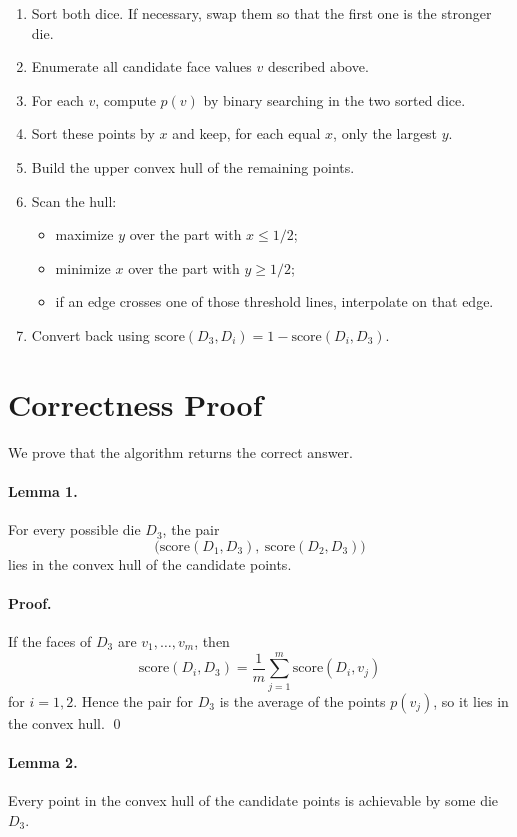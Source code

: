 \documentclass[11pt]{article}
\begin{document}
\begin{enumerate}[leftmargin=*]
    \item Sort both dice. If necessary, swap them so that the first one is the stronger die.
    \item Enumerate all candidate face values $v$ described above.
    \item For each $v$, compute $p(v)$ by binary searching in the two sorted dice.
    \item Sort these points by $x$ and keep, for each equal $x$, only the largest $y$.
    \item Build the upper convex hull of the remaining points.
    \item Scan the hull:
    \begin{itemize}[leftmargin=*]
        \item maximize $y$ over the part with $x \le 1/2$;
        \item minimize $x$ over the part with $y \ge 1/2$;
        \item if an edge crosses one of those threshold lines, interpolate on that edge.
    \end{itemize}
    \item Convert back using $\text{score}(D_3,D_i)=1-\text{score}(D_i,D_3)$.
\end{enumerate}

\section*{Correctness Proof}

We prove that the algorithm returns the correct answer.

\paragraph{Lemma 1.}
For every possible die $D_3$, the pair
\[
\bigl(\text{score}(D_1,D_3),\ \text{score}(D_2,D_3)\bigr)
\]
lies in the convex hull of the candidate points.

\paragraph{Proof.}
If the faces of $D_3$ are $v_1,\dots,v_m$, then
\[
\text{score}(D_i,D_3)=\frac{1}{m}\sum_{j=1}^{m}\text{score}(D_i,v_j)
\]
for $i=1,2$. Hence the pair for $D_3$ is the average of the points $p(v_j)$, so it lies in the convex
hull. \qed

\paragraph{Lemma 2.}
Every point in the convex hull of the candidate points is achievable by some die $D_3$.
\end{document}
